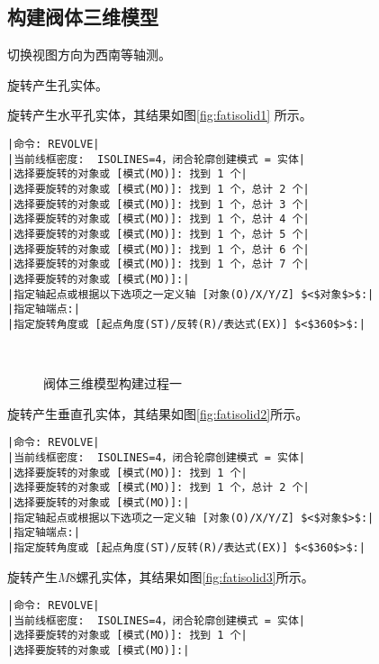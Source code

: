 \subsection{构建阀体三维模型}
\begin{procedure}
\item 切换视图方向为西南等轴测。
\item 旋转产生孔实体。

旋转产生水平孔实体，其结果如图\ref{fig:fatisolid1} 所示。
\begin{lstlisting}
|命令: REVOLVE|
|当前线框密度:  ISOLINES=4，闭合轮廓创建模式 = 实体|
|选择要旋转的对象或 [模式(MO)]: 找到 1 个|
|选择要旋转的对象或 [模式(MO)]: 找到 1 个，总计 2 个|
|选择要旋转的对象或 [模式(MO)]: 找到 1 个，总计 3 个|
|选择要旋转的对象或 [模式(MO)]: 找到 1 个，总计 4 个|
|选择要旋转的对象或 [模式(MO)]: 找到 1 个，总计 5 个|
|选择要旋转的对象或 [模式(MO)]: 找到 1 个，总计 6 个|
|选择要旋转的对象或 [模式(MO)]: 找到 1 个，总计 7 个|
|选择要旋转的对象或 [模式(MO)]:|
|指定轴起点或根据以下选项之一定义轴 [对象(O)/X/Y/Z] $<$对象$>$:|
|指定轴端点:|
|指定旋转角度或 [起点角度(ST)/反转(R)/表达式(EX)] $<$360$>$:|
\end{lstlisting}
\begin{figure}[htbp]
\centering
{}\hspace{30pt}
\\
\hspace{30pt}
\caption{阀体三维模型构建过程一}
\end{figure}
旋转产生垂直孔实体，其结果如图\ref{fig:fatisolid2}所示。
\begin{lstlisting}
|命令: REVOLVE|
|当前线框密度:  ISOLINES=4，闭合轮廓创建模式 = 实体|
|选择要旋转的对象或 [模式(MO)]: 找到 1 个|
|选择要旋转的对象或 [模式(MO)]: 找到 1 个，总计 2 个|
|选择要旋转的对象或 [模式(MO)]:|
|指定轴起点或根据以下选项之一定义轴 [对象(O)/X/Y/Z] $<$对象$>$:|
|指定轴端点:|
|指定旋转角度或 [起点角度(ST)/反转(R)/表达式(EX)] $<$360$>$:|
\end{lstlisting}
旋转产生$M8$螺孔实体，其结果如图\ref{fig:fatisolid3}所示。
\begin{lstlisting}
|命令: REVOLVE|
|当前线框密度:  ISOLINES=4，闭合轮廓创建模式 = 实体|
|选择要旋转的对象或 [模式(MO)]: 找到 1 个|
|选择要旋转的对象或 [模式(MO)]:|

\end{lstlisting}
\end{procedure}
